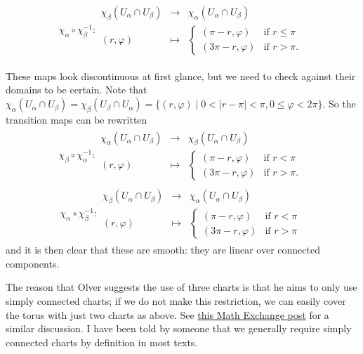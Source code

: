 \documentclass[a4paper]{article}
\begin{document}
\begin{align}
    \chi_\alpha \circ \chi_\beta^{-1} : \begin{array}{rcl} \chi_\beta(U_\alpha \cap U_\beta) & \to & \chi_\alpha(U_\alpha \cap U_\beta) \\ (r, \varphi) & \mapsto & \left\{ \begin{array}{ll} (\pi - r, \varphi) & \text{if } r \leq \pi \\ (3\pi - r, \varphi) & \text{if } r > \pi. \end{array} \right. \end{array}
\end{align}

These maps look discontinuous at first glance, but we need to check against their domains to be certain. Note that $\chi_\alpha(U_\alpha \cap U_\beta) = \chi_\beta(U_\beta \cap U_\alpha) = \{(r, \varphi) \mid 0 < |r - \pi| < \pi, 0 \leq \varphi < 2\pi\}$. So the transition maps can be rewritten
\begin{align}
    \chi_\beta \circ \chi_\alpha^{-1} : \begin{array}{rcl} \chi_\alpha(U_\alpha \cap U_\beta) & \to & \chi_\beta(U_\alpha \cap U_\beta) \\ (r, \varphi) & \mapsto & \left\{ \begin{array}{ll} (\pi - r, \varphi) & \text{if } r < \pi \\ (3\pi - r, \varphi) & \text{if } r > \pi. \end{array} \right. \end{array}
\end{align}
\begin{align}
    \chi_\alpha \circ \chi_\beta^{-1} : \begin{array}{rcl} \chi_\beta(U_\alpha \cap U_\beta) & \to & \chi_\alpha(U_\alpha \cap U_\beta) \\ (r, \varphi) & \mapsto & \left\{ \begin{array}{ll} (\pi - r, \varphi) & \text{if } r < \pi \\ (3\pi - r, \varphi) & \text{if } r > \pi \end{array} \right. \end{array}
\end{align}
and it is then clear that these are smooth: they are linear over connected components.

The reason that Olver suggests the use of three charts is that he aims to only use simply connected charts; if we do not make this restriction, we can easily cover the torus with just two charts as above. See \href{https://math.stackexchange.com/a/2898114/921952}{this Math Exchange post} for a similar discussion. I have been told by someone that we generally require simply connected charts by definition in most texts.
\end{document}
